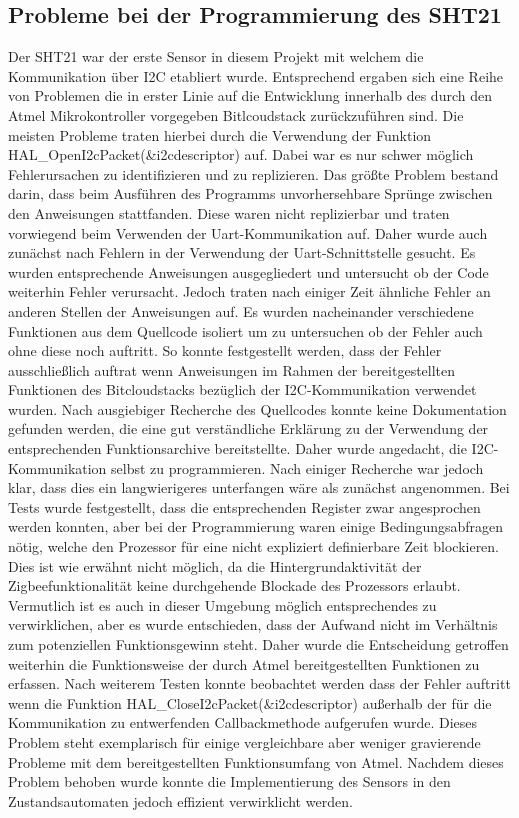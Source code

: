 \documentclass[]{article}
\begin{document}
		\subsection{Probleme bei der Programmierung des SHT21}
		Der SHT21 war der erste Sensor in diesem Projekt mit welchem die Kommunikation über I2C etabliert wurde. Entsprechend ergaben sich eine Reihe von Problemen die in erster Linie auf die Entwicklung innerhalb des durch den Atmel Mikrokontroller vorgegeben Bitlcoudstack zurückzuführen sind. Die meisten Probleme traten hierbei durch die Verwendung der Funktion HAL\_OpenI2cPacket(\&i2cdescriptor) auf. Dabei war es nur schwer möglich Fehlerursachen zu identifizieren und zu replizieren. Das größte Problem bestand darin, dass beim Ausführen des Programms unvorhersehbare Sprünge zwischen den Anweisungen stattfanden. Diese waren nicht replizierbar und traten vorwiegend beim Verwenden der Uart-Kommunikation auf. Daher wurde auch zunächst nach Fehlern in der Verwendung der Uart-Schnittstelle gesucht. Es wurden entsprechende Anweisungen ausgegliedert und untersucht ob der Code weiterhin Fehler verursacht. Jedoch traten nach einiger Zeit ähnliche Fehler an anderen Stellen der Anweisungen auf. Es wurden nacheinander verschiedene Funktionen aus dem Quellcode isoliert um zu untersuchen ob der Fehler auch ohne diese noch auftritt. So konnte festgestellt werden, dass der Fehler ausschließlich auftrat wenn Anweisungen im Rahmen der bereitgestellten Funktionen des Bitcloudstacks bezüglich der I2C-Kommunikation verwendet wurden. Nach ausgiebiger Recherche des Quellcodes konnte keine Dokumentation gefunden werden, die eine gut verständliche Erklärung zu der Verwendung der entsprechenden Funktionsarchive bereitstellte. Daher wurde angedacht, die I2C-Kommunikation selbst zu programmieren. Nach einiger Recherche war jedoch klar, dass dies ein langwierigeres unterfangen wäre als zunächst angenommen. Bei Tests wurde festgestellt, dass die entsprechenden Register zwar angesprochen werden konnten, aber bei der Programmierung waren einige Bedingungsabfragen nötig, welche den Prozessor für eine nicht expliziert definierbare Zeit blockieren. Dies ist wie erwähnt nicht möglich, da die Hintergrundaktivität der Zigbeefunktionalität keine durchgehende Blockade des Prozessors erlaubt. Vermutlich ist es auch in dieser Umgebung möglich entsprechendes zu verwirklichen, aber es wurde entschieden, dass der Aufwand nicht im Verhältnis zum potenziellen Funktionsgewinn steht. Daher wurde die Entscheidung getroffen weiterhin die Funktionsweise der durch Atmel bereitgestellten Funktionen zu erfassen. Nach weiterem Testen konnte beobachtet werden dass der Fehler auftritt wenn die Funktion HAL\_CloseI2cPacket(\&i2cdescriptor) außerhalb der für die Kommunikation zu entwerfenden Callbackmethode aufgerufen wurde. Dieses Problem steht exemplarisch für einige vergleichbare aber weniger gravierende Probleme mit dem bereitgestellten Funktionsumfang von Atmel. Nachdem dieses Problem behoben wurde konnte die Implementierung des Sensors in den Zustandsautomaten jedoch effizient verwirklicht werden. 
		
\end{document}
